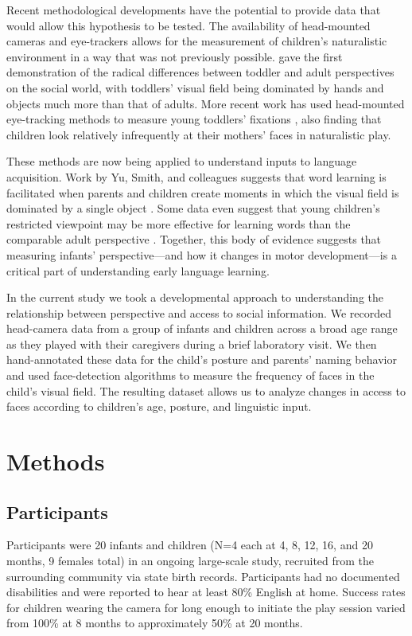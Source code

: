 \documentclass[man,noapacite]{apa2}
\begin{document}
Recent methodological developments have the potential to provide data that would allow this hypothesis to be tested. The availability of head-mounted cameras and eye-trackers allows for the measurement of children's naturalistic environment in a way that was not previously possible.  gave the first demonstration of the radical differences between toddler and adult perspectives on the social world, with toddlers' visual field being dominated by hands and objects much more than that of adults. More recent work has used head-mounted eye-tracking methods to measure young toddlers' fixations \cite{franchak2011}, also finding that children look relatively infrequently at their mothers' faces in naturalistic play.

These methods are now being applied to understand inputs to language acquisition. Work by Yu, Smith, and colleagues suggests that word learning is facilitated when parents and children create moments in which the visual field is dominated by a single object \cite{smith2011,yuinpress}. Some data even suggest that young children's restricted viewpoint may be more effective for learning words than the comparable adult perspective \cite{yurovsky2012}. Together, this body of evidence suggests that measuring infants' perspective---and how it changes in motor development---is a critical part of understanding early language learning.

In the current study we took a developmental approach to understanding the relationship between perspective and access to social information. We recorded head-camera data from a group of infants and children across a broad age range as they played with their caregivers during a brief laboratory visit. We then hand-annotated these data for the child's posture and parents' naming behavior and used face-detection algorithms to measure the frequency of faces in the child's visual field.  The resulting dataset allows us to analyze changes in access to faces according to children's age, posture, and linguistic input. 

\section{Methods}

\subsection{Participants}

Participants were 20 infants and children (N=4 each at 4, 8, 12, 16, and 20 months, 9 females total) in an ongoing large-scale study, recruited from the surrounding community via state birth records. Participants had no documented disabilities and were reported to hear at least 80\% English at home. Success rates for children wearing the camera for long enough to initiate the play session varied from 100\% at 8 months to approximately 50\% at 20 months. 
\end{document}
